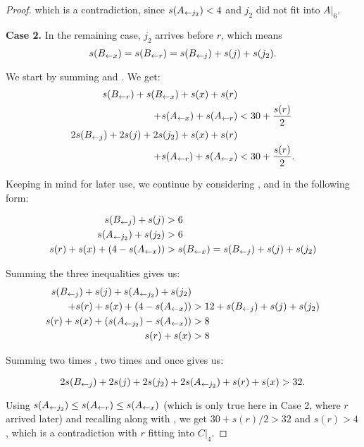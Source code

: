 \begin{proof}
which is a contradiction, since $s(A_{\leftarrow j_2}) < 4$ and $j_2$ did not fit into $A|_{6}$.

\smallskip

\noindent \textbf{Case 2.} In the remaining case, $j_2$ arrives before $r$, which means
\[ s(B_{\leftarrow x}) = s(B_{\leftarrow r}) = s(B_{\leftarrow j}) + s(j) + s(j_2). \]


We start by summing  and . We get:
\begin{align}
s(B_{\leftarrow r}) + s(B_{\leftarrow x}) + s(x) + s(r) &\nonumber\\
+ s(A_{\leftarrow x}) + s(A_{\leftarrow r}) &< 30 + \frac{s(r)}{2} \nonumber \\ 
2s(B_{\leftarrow j}) + 2s(j) + 2s(j_2) + s(x) + s(r) &\nonumber\\
+ s(A_{\leftarrow r}) + s(A_{\leftarrow x}) &< 30 + \frac{s(r)}{2}. \label{eq:result1}
\end{align}

Keeping  in mind for later use, we continue
by considering ,  and  in the
following form:

\begin{align}
s(B_{\leftarrow j}) + s(j) &> 6 \label{eq:1applied}\\
s(A_{\leftarrow j_2}) + s(j_2) &> 6 \label{eq:2applied}\\
s(r) + s(x) + (4 - s(A_{\leftarrow x})) &> s(B_{\leftarrow x}) = s(B_{\leftarrow j}) + s(j) + s(j_2) \nonumber
\end{align}

Summing the three inequalities gives us:
\begin{align}
s(B_{\leftarrow j}) + s(j) + s(A_{\leftarrow j_2}) + s(j_2) &\nonumber\\
+ s(r) + s(x) + (4 - s(A_{\leftarrow x})) &> 12 + s(B_{\leftarrow j}) + s(j) + s(j_2)\nonumber\\
s(r) + s(x) + \left( s(A_{\leftarrow j_2}) - s(A_{\leftarrow x}) \right) &> 8 \nonumber\\ 
s(r) + s(x) &> 8\label{eq:result3}
\end{align}

Summing two times , two times
 and once  gives us:

\begin{equation}\label{eq:result2}
2s(B_{\leftarrow j}) + 2s(j) + 2s(j_2) + 2s(A_{\leftarrow j_2}) + s(r) + s(x) > 32.
\end{equation}

Using $s(A_{\leftarrow j_2}) \le s(A_{\leftarrow r}) \le s(A_{\leftarrow x})$ (which is only true here
in Case 2, where $r$ arrived later) and recalling
 along with , we get $30 +
s(r)/2 > 32$ and $s(r) > 4$, which is a contradiction with $r$ fitting into
$C|_4$.

\end{proof}

